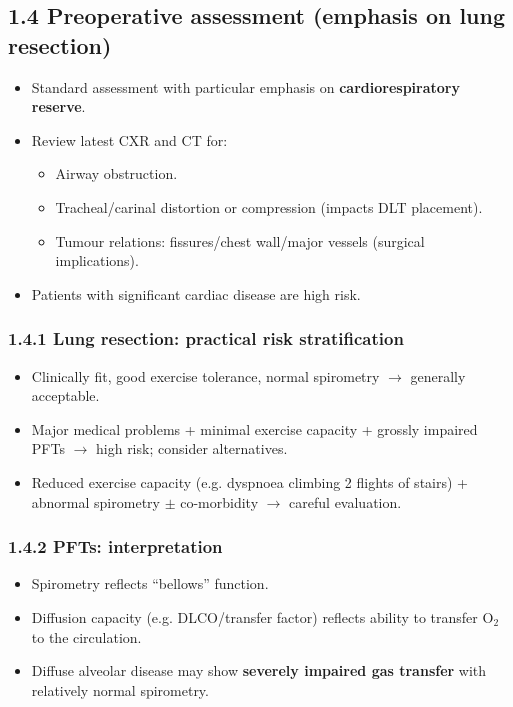 \documentclass[11pt,a4paper]{article}
\begin{document}
\subsection{1.4 Preoperative assessment (emphasis on lung resection)}
\begin{itemize}[leftmargin=*, itemsep=2pt]
  \item Standard assessment with particular emphasis on \textbf{cardiorespiratory reserve}.
  \item Review latest CXR and CT for:
  \begin{itemize}[leftmargin=*, itemsep=2pt]
    \item Airway obstruction.
    \item Tracheal/carinal distortion or compression (impacts DLT placement).
    \item Tumour relations: fissures/chest wall/major vessels (surgical implications).
  \end{itemize}
  \item Patients with significant cardiac disease are high risk.
\end{itemize}

\subsubsection{1.4.1 Lung resection: practical risk stratification}
\begin{itemize}[leftmargin=*, itemsep=2pt]
  \item Clinically fit, good exercise tolerance, normal spirometry \(\rightarrow\) generally acceptable.
  \item Major medical problems + minimal exercise capacity + grossly impaired PFTs \(\rightarrow\) high risk; consider alternatives.
  \item Reduced exercise capacity (e.g. dyspnoea climbing 2 flights of stairs) + abnormal spirometry \(\pm\) co-morbidity \(\rightarrow\) careful evaluation.
\end{itemize}

\subsubsection{1.4.2 PFTs: interpretation}
\begin{itemize}[leftmargin=*, itemsep=2pt]
  \item Spirometry reflects ``bellows'' function.
  \item Diffusion capacity (e.g. DLCO/transfer factor) reflects ability to transfer \(\mathrm{O_2}\) to the circulation.
  \item Diffuse alveolar disease may show \textbf{severely impaired gas transfer} with relatively normal spirometry.
\end{itemize}
\end{document}
